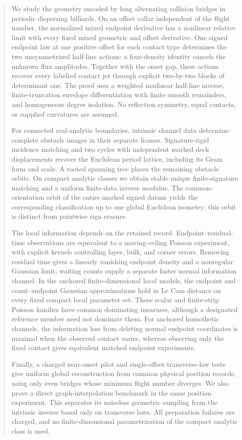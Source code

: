 \begin{abstract}
We study the geometry encoded by long alternating collision bridges in
periodic dispersing billiards.  On an offset collar independent of the flight
number, the normalized mixed endpoint derivative has a nonlinear relative
limit with every fixed mixed geometric and offset derivative.  One signed
endpoint law at one positive offset for each contact type determines the two
unsymmetrized half-line actions: a four-density identity cancels the unknown
flux amplitudes.  Together with the onset gap, these actions recover every
labelled contact jet through explicit two-by-two blocks of determinant one.
The proof uses a weighted nonlinear half-line inverse, finite-truncation
envelope differentiation with finite smooth remainders, and homogeneous
degree isolation.  No reflection
symmetry, equal contacts, or supplied curvatures are assumed.

For connected real-analytic boundaries, intrinsic channel data determine
complete obstacle images in their separate frames.  Signature-rigid incidence
matching and two cycles with independent marked deck displacements recover
the Euclidean period lattice, including its Gram form and scale.  A rooted
spanning tree places the remaining obstacle orbits.  On compact analytic
classes we obtain stable unique finite-signature matching and a uniform
finite-data inverse modulus.  The common-orientation orbit of the entire
marked signed datum yields the corresponding classification up to one global
Euclidean isometry; this orbit is distinct from pointwise sign erasure.

The local information depends on the retained record.  Endpoint--residual-time
observations are equivalent to a moving-ceiling Poisson experiment, with
explicit kernels controlling layer, bulk, and corner errors.  Removing
residual time gives a linearly vanishing endpoint density and a nonregular
Gaussian limit; waiting counts supply a separate faster normal information
channel.  In the anchored finite-dimensional local models, the endpoint and
count--endpoint Gaussian approximations hold in Le Cam distance on every
fixed compact local parameter set.  These scalar and finite-strip Poisson
families have common dominating measures, although a designated reference
member need not dominate them.  For anchored homothetic channels, the
information loss from deleting normal endpoint coordinates is maximal when
the observed contact varies, whereas observing only the fixed contact gives
equivalent matched endpoint experiments.

Finally, a charged near-onset pilot and single-offset transverse-law tests
give uniform global reconstruction from common physical position records,
using only even bridges whose minimum flight number diverges.  We also prove
a direct graph-interpolation benchmark in the same position experiment.
This separates its noiseless geometric sampling from the intrinsic inverse
based only on transverse laws.  All preparation failures are charged, and
no finite-dimensional parametrization of the compact analytic class is used.
\end{abstract}
